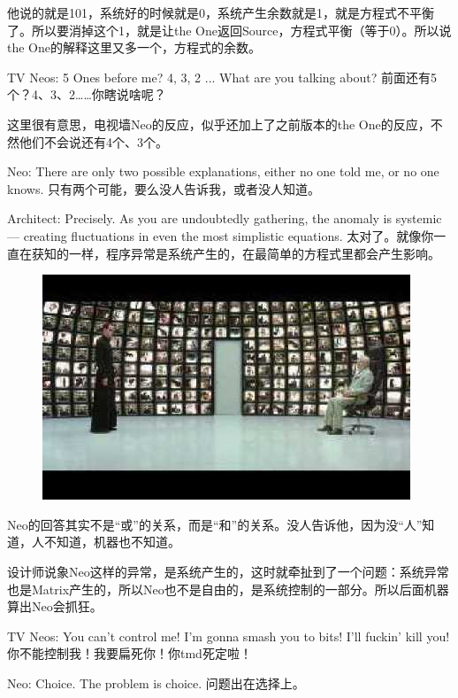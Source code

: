 \documentclass[UTF8]{ctexart}
\begin{document}
他说的就是101，系统好的时候就是0，系统产生余数就是1，就是方程式不平衡了。所以要消掉这个1，就是让the One返回Source，方程式平衡（等于0）。所以说the One的解释这里又多一个，方程式的余数。

TV Neos: 5 Ones before me? 4, 3, 2 ... What are you talking about? 前面还有5个？4、3、2……你瞎说啥呢？

这里很有意思，电视墙Neo的反应，似乎还加上了之前版本的the One的反应，不然他们不会说还有4个、3个。

Neo: There are only two possible explanations, either no one told me, or no one knows. 只有两个可能，要么没人告诉我，或者没人知道。

Architect: Precisely. As you are undoubtedly gathering, the anomaly is systemic --- creating fluctuations in even the most simplistic equations. 太对了。就像你一直在获知的一样，程序异常是系统产生的，在最简单的方程式里都会产生影响。

\begin{figure}[htb]
\centering
\includegraphics[width=0.5\linewidth]{fig/read_reloaded-161}
\end{figure}

Neo的回答其实不是“或”的关系，而是“和”的关系。没人告诉他，因为没“人”知道，人不知道，机器也不知道。

设计师说象Neo这样的异常，是系统产生的，这时就牵扯到了一个问题：系统异常也是Matrix产生的，所以Neo也不是自由的，是系统控制的一部分。所以后面机器算出Neo会抓狂。

TV Neos: You can’t control me! I’m gonna smash you to bits! I’ll fuckin’ kill you! 你不能控制我！我要扁死你！你tmd死定啦！

Neo: Choice. The problem is choice. 问题出在选择上。
\end{document}
